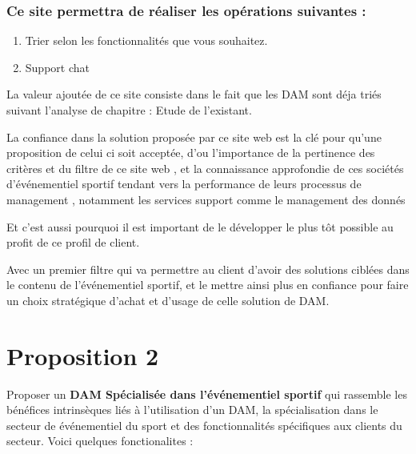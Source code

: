 \subsubsection{Ce site permettra de réaliser les opérations suivantes : }{} 

\begin{enumerate}
\item Trier selon les fonctionnalités que vous souhaitez.
\item Support chat 
\end{enumerate}
 
 La valeur ajoutée de ce site consiste dans le fait que les DAM sont déja triés
suivant l’analyse de chapitre : Etude de l’existant.

La confiance dans la solution proposée par ce site web est la clé pour qu’une proposition de celui ci soit acceptée, d'ou l'importance de la pertinence des critères et du filtre de ce site web , et la connaissance approfondie de ces sociétés d’événementiel sportif tendant vers la performance de leurs processus de management , notamment les services support comme le  management  des donnés  

Et c’est aussi pourquoi il est important de le développer le plus tôt possible au profit de ce profil de client.

Avec un premier filtre qui va permettre au client d’avoir des solutions ciblées dans
le contenu de l’événementiel sportif,  et le mettre ainsi plus en confiance pour faire un choix stratégique d'achat et d'usage de celle solution de DAM.
 

\section{Proposition 2}
Proposer un \textbf{DAM Spécialisée dans l’événementiel sportif}   qui rassemble les bénéfices intrinsèques liés à l’utilisation d’un DAM, la spécialisation dans le secteur de événementiel  du sport et des fonctionnalités spécifiques aux clients du secteur. Voici quelques fonctionalites :

